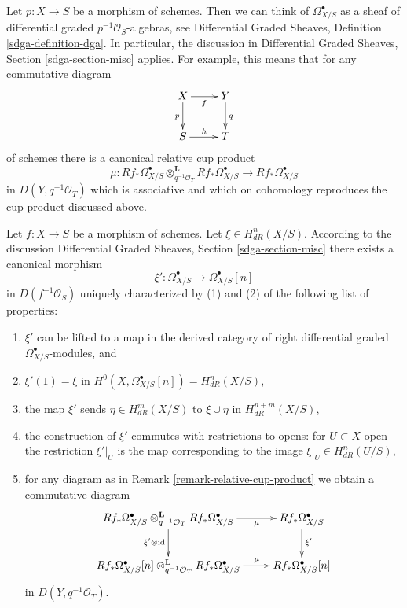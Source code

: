 \begin{remark}
\label{remark-relative-cup-product}
Let $p : X \to S$ be a morphism of schemes. Then we can think of
$\Omega^\bullet_{X/S}$ as a sheaf of differential graded
$p^{-1}\mathcal{O}_S$-algebras, see
Differential Graded Sheaves, Definition \ref{sdga-definition-dga}.
In particular, the discussion in
Differential Graded Sheaves, Section \ref{sdga-section-misc}
applies. For example, this means that for any commutative diagram
$$
\xymatrix{
X \ar[d]_p \ar[r]_f & Y \ar[d]^q \\
S \ar[r]^h & T
}
$$
of schemes there is a canonical relative cup product
$$
\mu :
Rf_*\Omega^\bullet_{X/S}
\otimes_{q^{-1}\mathcal{O}_T}^\mathbf{L}
Rf_*\Omega^\bullet_{X/S}
\longrightarrow
Rf_*\Omega^\bullet_{X/S}
$$
in $D(Y, q^{-1}\mathcal{O}_T)$ which is associative and
which on cohomology reproduces the cup product discussed above.
\end{remark}

\begin{remark}
\label{remark-cup-product-as-a-map}
Let $f : X \to S$ be a morphism of schemes. Let $\xi \in H_{dR}^n(X/S)$.
According to the discussion
Differential Graded Sheaves, Section \ref{sdga-section-misc}
there exists a canonical morphism
$$
\xi' : \Omega^\bullet_{X/S} \to \Omega^\bullet_{X/S}[n]
$$
in $D(f^{-1}\mathcal{O}_S)$ uniquely characterized by
(1) and (2) of the following list of properties:
\begin{enumerate}
\item $\xi'$ can be lifted to a map in the derived category of right
differential graded $\Omega^\bullet_{X/S}$-modules, and
\item $\xi'(1) = \xi$ in
$H^0(X, \Omega^\bullet_{X/S}[n]) = H^n_{dR}(X/S)$,
\item the map $\xi'$ sends $\eta \in H^m_{dR}(X/S)$
to $\xi \cup \eta$ in $H^{n + m}_{dR}(X/S)$,
\item the construction of $\xi'$ commutes with restrictions to
opens: for $U \subset X$ open the restriction $\xi'|_U$ is
the map corresponding to the image $\xi|_U \in H^n_{dR}(U/S)$,
\item for any diagram as in Remark \ref{remark-relative-cup-product}
we obtain a commutative diagram
$$
\xymatrix{
Rf_*\Omega^\bullet_{X/S}
\otimes_{q^{-1}\mathcal{O}_T}^\mathbf{L}
Rf_*\Omega^\bullet_{X/S} \ar[d]_{\xi' \otimes \text{id}}
\ar[r]_-\mu &
Rf_*\Omega^\bullet_{X/S} \ar[d]^{\xi'} \\
Rf_*\Omega^\bullet_{X/S}[n]
\otimes_{q^{-1}\mathcal{O}_T}^\mathbf{L}
Rf_*\Omega^\bullet_{X/S}
\ar[r]^-\mu &
Rf_*\Omega^\bullet_{X/S}[n]
}
$$
in $D(Y, q^{-1}\mathcal{O}_T)$.
\end{enumerate}
\end{remark}




